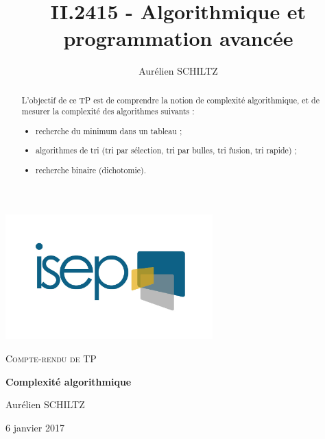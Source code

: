 \newcommand*{\ROOT}{./src}



\graphicspath{{\ROOT/}}


\title{II.2415 - Algorithmique et programmation avancée}
\author{Aurélien SCHILTZ}

\makeatletter
{}
\makeatother



\begin{titlepage}
	\centering
	\includegraphics[width=8cm]{logo}
	\par
	\vspace{4cm}

	{\scshape\Large Compte-rendu de TP\par}
	\vspace{1.5cm}
	{\huge\bfseries Complexité algorithmique \par}
	\vspace{2cm}
	{\Large Aurélien SCHILTZ\par}
	\vfill\par
	\par
	\vfill

	{\large 6 janvier 2017}
\end{titlepage}


\newpage
\begin{abstract}

  L'objectif de ce TP est de comprendre la notion de complexité algorithmique, et de mesurer la complexité des algorithmes suivants :
  \begin{itemize}
    \item recherche du minimum dans un tableau ;
    \item algorithmes de tri (tri par sélection, tri par bulles, tri fusion, tri rapide) ;
    \item recherche binaire (dichotomie).
  \end{itemize}

\end{abstract}

